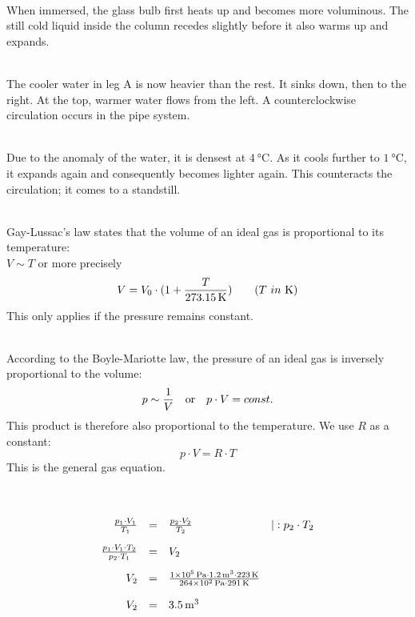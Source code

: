 \documentclass[a4paper]{article}
\begin{document}
	\\
	When immersed, the glass bulb first heats up and becomes more voluminous. The still cold liquid inside the column recedes slightly before it also warms up and expands.
	\vspace{0.5 cm}
	
	\\
	The cooler water in leg A is now heavier than the rest. It sinks down, then to the right. At the top, warmer water flows from the left. A counterclockwise circulation occurs in the pipe system.
	\vspace{0.5 cm}
	
	\\
	Due to the anomaly of the water, it is densest at $\SI{4}{\celsius}$. As it cools further to $\SI{1}{\celsius}$, it expands again and consequently becomes lighter again. This counteracts the circulation; it comes to a standstill.
	\vspace{0.5 cm}
	
	\\
	Gay-Lussac's law states that the volume of an ideal gas is proportional to its temperature:\\
	$V \sim T $ or more precisely
	$$ V = V_0\cdot (1+ {T \over \SI{273,15}{\kelvin}})\qquad (T ~in~\SI{}{\kelvin}) $$
	This only applies if the pressure remains constant.
	\vspace{0.5 cm}
	
	\\
	According to the Boyle-Mariotte law, the pressure of an ideal gas is inversely proportional to the volume:
	$$ p \sim {1 \over V} \quad \textnormal{or} \quad p \cdot V = const.$$
	This product is therefore also proportional to the temperature. We use $R$ as a constant:
	$$ p \cdot V = R \cdot T $$
	This is the general gas equation.
	\vspace{0.5 cm}
	
	\\
	$$
	\renewcommand{\arraystretch}{2}
	\begin{array}{rcll}
		{p_1 \cdot V_1 \over T_1} &=& {p_2 \cdot V_2 \over T_2} & |: p_2 \cdot T_2 \\
		{p_1 \cdot V_1 \cdot T_2 \over p_2 \cdot T_1} &=& V_2 \\
		V_2 &=& {\SI{1e5}{\pascal} \cdot \SI{1,2}{\meter^3} \cdot \SI{223}{\kelvin} \over \SI{264e2}{\pascal } \cdot \SI{291}{\kelvin}}\\
		V_2 &=& \SI{3,5}{\meter^3}
	\end{array}
	$$
	\vspace{0.5 cm}
	
\end{document}
